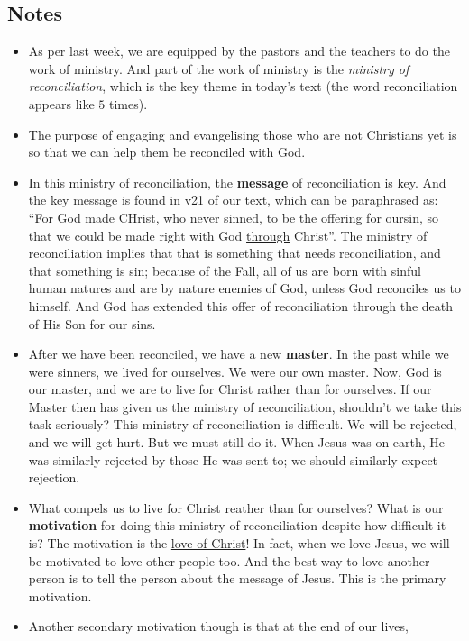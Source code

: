 \subsection*{Notes}
\begin{itemize}
  \item{As per last week, we are equipped by the pastors and the teachers to
  do the work of ministry.  And part of the work of ministry is the
  \textit{ministry of reconciliation}, which is the key theme in today's
  text (the word reconciliation appears like $5$ times).}
  \item{The purpose of engaging and evangelising those who are not Christians
  yet is so that we can help them be reconciled with God.}
  \item{In this ministry of reconciliation, the \textbf{message} of
  reconciliation is key.  And the key message is found in v21 of our text,
  which can be paraphrased as: ``For God made CHrist, who never sinned, to be
  the offering for oursin, so that we could be made right with God
  \underline{through} Christ''.  The ministry of reconciliation implies that
  that is something that needs reconciliation, and that something is sin;
  because of the Fall, all of us are born with sinful human natures and are
  by nature enemies of God, unless God reconciles us to himself. And God has extended this offer of reconciliation through the death of His Son for our sins.}
  \item{After we have been reconciled, we have a new \textbf{master}.  In the
  past while we were sinners, we lived for ourselves.  We were our own
  master.  Now, God is our master, and we are to live for Christ rather than
  for ourselves.  If our Master then has given us the ministry of
  reconciliation, shouldn't we take this task seriously?  This ministry of
  reconciliation is difficult.  We will be rejected, and we will get hurt.
  But we must still do it.  When Jesus was on earth, He was similarly
  rejected by those He was sent to; we should similarly expect rejection.  }
  \item{What compels us to live for Christ reather than for ourselves?  What
  is our \textbf{motivation} for doing this ministry of reconciliation
  despite how difficult it is?  The motivation is the \underline{love of
  Christ}!  In fact, when we love Jesus, we will be motivated to love other
  people too.  And the best way to love another person is to tell the person
  about the message of Jesus.  This is the primary motivation.}
  \item{Another secondary motivation though is that at the end of our lives,
}
\end{itemize}
